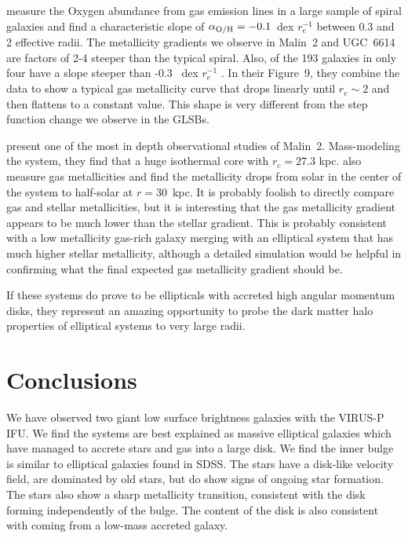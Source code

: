 \documentclass{emulateapj}
\newcommand\HI{\ion{H}{1}}
\begin{document}
\citet{Sanchez14} measure the Oxygen abundance from gas emission lines in a large sample of spiral galaxies and find a characteristic slope of $\alpha_{\rm{O/H}} = -0.1$\ dex $r_e^{-1}$ between 0.3 and 2 effective radii.  The metallicity gradients we observe in Malin~2 and UGC~6614 are factors of 2-4 steeper than the typical spiral. Also, of the 193 galaxies in \citet{Sanchez14} only four have a slope steeper than -0.3 \ dex $r_e^{-1}$ \citep[Figure~6]{Sanchez14}.  In their Figure~9, they combine the data to show a typical gas metallicity curve that drops linearly until $r_e\sim2$ and then flattens to a constant value.  This shape is very different from the step function change we observe in the GLSBs.



\citet{Kasparova14} present one of the most in depth observational studies of Malin~2.  Mass-modeling the system, they find that a huge isothermal core with $r_c=27.3$ kpc.  \citet{Kasparova14} also measure gas metallicities and find the metallicity drops from solar in the center of the system to half-solar at $r=30$\ kpc.  It is probably foolish to directly compare gas and stellar metallicities, but it is interesting that the gas metallicity gradient appears to be much lower than the stellar gradient.  This is probably consistent with a low metallicity gas-rich galaxy merging with an elliptical system that has much higher stellar metallicity, although a detailed simulation would be helpful in confirming what the final expected gas metallicity gradient should be.

If these systems do prove to be ellipticals with accreted high angular momentum disks, they represent an amazing opportunity to probe the dark matter halo properties of elliptical systems to very large radii. 


\section{Conclusions}

We have observed two giant low surface brightness galaxies with the VIRUS-P IFU.  We find the systems are best explained as massive elliptical galaxies which have managed to accrete stars and gas into a large disk.  We find the inner bulge is similar to elliptical galaxies found in SDSS.  The stars have a disk-like velocity field, are dominated by old stars, but do show signs of ongoing star formation. The stars also show a sharp metallicity transition, consistent with the disk forming independently of the bulge. The \HI content of the disk is also consistent with coming from a low-mass accreted galaxy.
\end{document}
